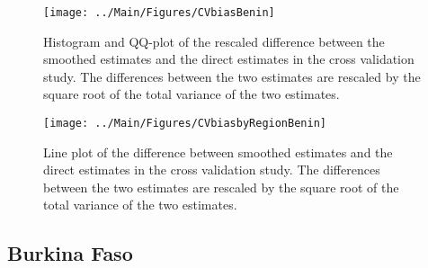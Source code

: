 \documentclass[12pt]{article}\usepackage[]{graphicx}\usepackage[]{color}
\newenvironment{knitrout}{}{} %
\begin{document}
\begin{knitrout}
\color{fgcolor}\begin{figure}[bht]

{\centering \texttt{[image: ../Main/Figures/CVbiasBenin]} 

}

\caption[Histogram and QQ-plot of the rescaled difference between the smoothed estimates and the direct estimates in the cross validation study]{Histogram and QQ-plot of the rescaled difference between the smoothed estimates and the direct estimates in the cross validation study. The differences between the two estimates are rescaled by the square root of the total variance of the two estimates.}\label{fig:unnamed-chunk-19}
\end{figure}


\end{knitrout}

\begin{knitrout}
\color{fgcolor}\begin{figure}[bht]

{\centering \texttt{[image: ../Main/Figures/CVbiasbyRegionBenin]} 

}

\caption[Line plot of the difference between smoothed estimates and the direct estimates in the cross validation study]{Line plot of the difference between smoothed estimates and the direct estimates in the cross validation study. The differences between the two estimates are rescaled by the square root of the total variance of the two estimates.}\label{fig:unnamed-chunk-20}
\end{figure}


\end{knitrout}

\clearpage
\subsection{Burkina Faso}


\end{document}
